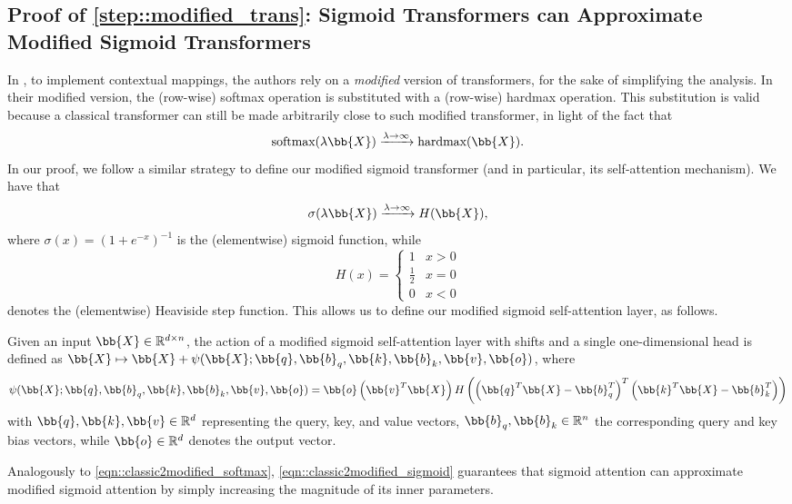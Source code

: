 \subsection{Proof of \cref{step::modified_trans}: Sigmoid Transformers can Approximate Modified Sigmoid Transformers}
\label{sec::proof_modified_sigmoid}
In \cite{Yun_UAP}, to implement contextual mappings, the authors rely on a \emph{modified} version of transformers, for the sake of simplifying the analysis. In their modified version, the (row-wise) softmax operation is substituted with a (row-wise) hardmax operation. This substitution is valid because a classical transformer can still be made arbitrarily close to such modified transformer, in light of the fact that
\begin{equation}
    \text{softmax}(\lambda\bb{X})\xrightarrow[]{\lambda\to\infty}\text{hardmax}(\bb{X}).
    \label{eqn::classic2modified_softmax}
\end{equation}
In our proof, we follow a similar strategy to define our modified sigmoid transformer (and in particular, its self-attention mechanism). We have that
\begin{equation}
    \sigma(\lambda\bb{X})\xrightarrow{\lambda\to\infty}H(\bb{X}),
    \label{eqn::classic2modified_sigmoid}
\end{equation}
where $\sigma(x)=(1+e^{-x})^{-1}$ is the (elementwise) sigmoid function, while
\begin{equation}
    H(x) = \begin{cases}
        1 & x>0\\
        \frac{1}{2} & x=0\\
        0 & x<0
    \end{cases}
\end{equation}
denotes the (elementwise) Heaviside step function. This allows us to define our modified sigmoid self-attention layer, as follows.
\begin{definition}
\label{def::modified_sigmoid_attention}
    Given an input $\bb{X}\in\mathbb{R}^{d\times n}$, the action of a modified sigmoid self-attention layer with shifts and a single one-dimensional head is defined as $\bb{X}\mapsto \bb{X} + \psi(\bb{X};\bb{q},\bb{b}_q,\bb{k},\bb{b}_k,\bb{v},\bb{o})$, where
    \begin{equation}
        \psi(\bb{X};\bb{q},\bb{b}_q,\bb{k},\bb{b}_k,\bb{v},\bb{o}) = \bb{o}\left(\bb{v}^T \bb{X}\right) H\left(\left(\bb{q}^T \bb{X}-\bb{b}_q^T\right)^T\left(\bb{k}^T \bb{X}-\bb{b}_k^T\right)\right)
        \label{eqn::modified_sigmoid_attention}
    \end{equation}
    with $\bb{q},\bb{k},\bb{v}\in\mathbb{R}^{d}$ representing the query, key, and value vectors, $\bb{b}_q,\bb{b}_k\in\mathbb{R}^{n}$ the corresponding query and key bias vectors, while $\bb{o}\in\mathbb{R}^{d}$ denotes the output vector.
\end{definition}
Analogously to \cref{eqn::classic2modified_softmax}, \cref{eqn::classic2modified_sigmoid} guarantees that sigmoid attention can approximate modified sigmoid attention by simply increasing the magnitude of its inner parameters.

